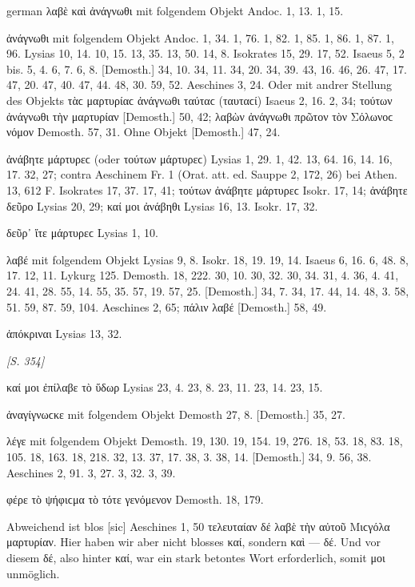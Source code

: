 \begin{otherlanguage*}{german}
 λαβὲ καὶ ἀνάγνωθι mit folgendem Objekt Andoc. 1, 13. 1, 15.

 ἀνάγνωθι mit folgendem Objekt Andoc. 1, 34. 1, 76. 1, 82. 1, 85. 1, 86. 1, 87. 1, 96. Lysias 10, 14. 10, 15. 13, 35. 13, 50. 14, 8. Isokrates 15, 29. 17, 52. Isaeus 5, 2 bis. 5, 4. 6, 7. 6, 8. [Demosth.] 34, 10. 34, 11. 34, 20. 34, 39. 43, 16. 46, 26. 47, 17. 47, 20. 47, 40. 47, 44. 48, 30. 59, 52. Aeschines 3, 24. Oder mit andrer Stellung des Objekts  τὰϲ μαρτυρίαϲ ἀνάγνωθι ταύταϲ (ταυταϲί) Isaeus 2, 16. 2, 34;  τούτων ἀνάγνωθι τὴν μαρτυρίαν [Demosth.] 50, 42;  λαβὼν ἀνάγνωθι πρῶτον τὸν Σόλωνοϲ νόμον Demosth. 57, 31. Ohne Objekt [Demosth.] 47, 24.

 ἀνάβητε μάρτυρεϲ (oder τούτων μάρτυρεϲ) Lysias 1, 29. 1, 42. 13, 64. 16, 14. 16, 17. 32, 27; contra Aeschinem Fr. 1 (Orat. att. ed. Sauppe 2, 172, 26) bei Athen. 13, 612 F. Isokrates 17, 37. 17, 41;  τούτων ἀνάβητε μάρτυρεϲ Isokr. 17, 14;  ἀνάβητε δεῦρο Lysias 20, 29; καί μοι ἀνάβηθι Lysias 16, 13. Isokr. 17, 32.

 δεῦρ᾽ ἴτε μάρτυρεϲ Lysias 1, 10.

 λαβέ mit folgendem Objekt Lysias 9, 8. Isokr. 18, 19. 19, 14. Isaeus 6, 16. 6, 48. 8, 17. 12, 11. Lykurg 125. Demosth. 18, 222. 30, 10. 30, 32. 30, 34. 31, 4. 36, 4. 41, 24. 41, 28. 55, 14. 55, 35. 57, 19. 57, 25. [Demosth.] 34, 7. 34, 17. 44, 14. 48, 3. 58, 51. 59, 87. 59, 104. Aeschines 2, 65;  πάλιν λαβέ [Demosth.] 58, 49.

 ἀπόκριναι Lysias 13, 32.

\hypertarget{p354}{\emph{[S. 354]}}\label{p354} καί μοι ἐπίλαβε τὸ ὕδωρ Lysias 23, 4. 23, 8. 23, 11. 23, 14. 23, 15.

 ἀναγίγνωϲκε mit folgendem Objekt Demosth 27, 8. [Demosth.] 35, 27.

 λέγε mit folgendem Objekt Demosth. 19, 130. 19, 154. 19, 276. 18, 53. 18, 83. 18, 105. 18, 163. 18, 218. 32, 13. 37, 17. 38, 3. 38, 14. [Demosth.] 34, 9. 56, 38. Aeschines 2, 91. 3, 27. 3, 32. 3, 39.

 φέρε τὸ ψήφιϲμα τὸ τότε γενόμενον Demosth. 18, 179.

Abweichend ist blos [sic] Aeschines 1, 50  τελευταίαν δέ  λαβὲ τὴν αὐτοῦ Μιϲγόλα μαρτυρίαν. Hier haben wir aber nicht blosses καί, sondern καὶ — δέ. Und vor diesem δέ, also hinter καί, war ein stark betontes Wort erforderlich, somit μοι unmöglich.


\end{otherlanguage*}
